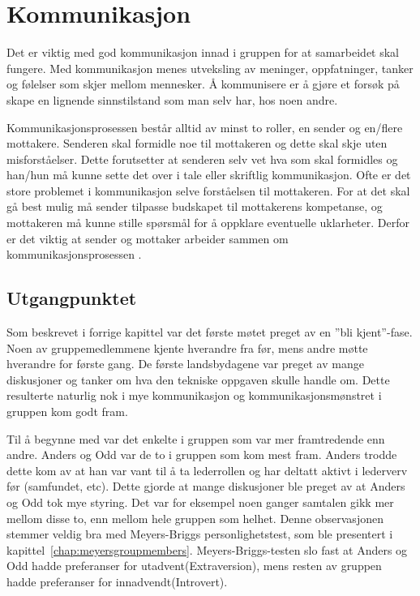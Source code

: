 \section{Kommunikasjon}
Det er viktig med god kommunikasjon innad i gruppen for at samarbeidet skal fungere. 
Med kommunikasjon menes utveksling av meninger, oppfatninger, tanker og følelser som skjer mellom mennesker.
Å kommunisere er å gjøre et forsøk på skape en lignende sinnstilstand som man selv har, hos noen andre\citep{levin}.
\vspace{\secspace}

Kommunikasjonsprosessen består alltid av minst to roller, en sender og en/flere mottakere. 
Senderen skal formidle noe til mottakeren og dette skal skje uten misforståelser. 
Dette forutsetter at senderen selv vet hva som skal formidles og han/hun må kunne sette det over i tale eller skriftlig kommunikasjon. 
Ofte er det store problemet i kommunikasjon selve forståelsen til mottakeren. 
For at det skal gå best mulig må sender tilpasse budskapet til mottakerens kompetanse, og mottakeren må kunne stille spørsmål for å oppklare eventuelle uklarheter. 
Derfor er det viktig at sender og mottaker arbeider sammen om kommunikasjonsprosessen \citep{levin}.

\subsection{Utgangpunktet}
Som beskrevet i forrige kapittel var det første møtet preget av en ''bli kjent''-fase. 
Noen av gruppemedlemmene kjente hverandre fra før, mens andre møtte hverandre for første gang. 
De første landsbydagene var preget av mange diskusjoner og tanker om hva den tekniske oppgaven skulle handle om. 
Dette resulterte naturlig nok i mye kommunikasjon og kommunikasjonsmønstret i gruppen kom godt fram. 
\vspace{\secspace}

Til å begynne med var det enkelte i gruppen som var mer framtredende enn andre. 
Anders og Odd var de to i gruppen som kom mest fram. 
Anders trodde dette kom av at han var vant til å ta lederrollen og har deltatt aktivt i lederverv før (samfundet, etc).
Dette gjorde at mange diskusjoner ble preget av at Anders og Odd tok mye styring. 
Det var for eksempel noen ganger samtalen gikk mer mellom disse to, enn mellom hele gruppen som helhet. 
Denne observasjonen stemmer veldig bra med Meyers-Briggs personlighetstest, som ble presentert i kapittel~\ref{chap:meyersgroupmembers}.
Meyers-Briggs-testen slo fast at Anders og Odd hadde preferanser for utadvent(Extraversion), mens resten av gruppen hadde preferanser for innadvendt(Introvert). 
\vspace{\secspace}

